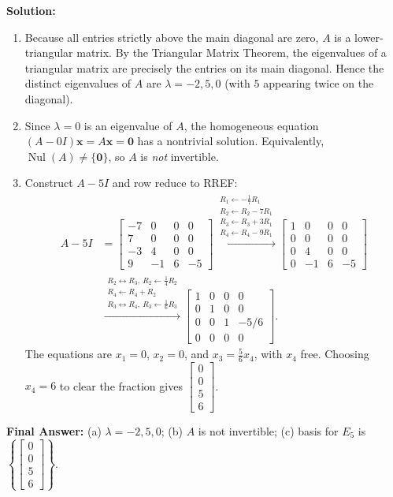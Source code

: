 \documentclass[11pt, letterpaper]{article}
\theoremstyle{definition}
\theoremstyle{remark}
\begin{document}
\textbf{Solution:}
\begin{enumerate}[label=(\alph*)]
    \item Because all entries strictly above the main diagonal are zero, $A$ is a lower-triangular matrix. By the Triangular Matrix Theorem, the eigenvalues of a triangular matrix are precisely the entries on its main diagonal. Hence the distinct eigenvalues of $A$ are $\lambda = -2, 5, 0$ (with $5$ appearing twice on the diagonal).

    \item Since $\lambda = 0$ is an eigenvalue of $A$, the homogeneous equation $(A - 0I)\mathbf{x} = A\mathbf{x} = \mathbf{0}$ has a nontrivial solution. Equivalently, $\operatorname{Nul}(A) \neq \{\mathbf{0}\}$, so $A$ is \emph{not} invertible.

    \item Construct $A - 5I$ and row reduce to RREF:
    \begin{align*}
    A - 5I &= \begin{bmatrix} -7 & 0 & 0 & 0 \\ 7 & 0 & 0 & 0 \\ -3 & 4 & 0 & 0 \\ 9 & -1 & 6 & -5 \end{bmatrix}
    \xrightarrow{\substack{R_1 \leftarrow -\frac{1}{7}R_1 \\ R_2 \leftarrow R_2 - 7R_1 \\ R_3 \leftarrow R_3 + 3R_1 \\ R_4 \leftarrow R_4 - 9R_1}}
    \begin{bmatrix} 1 & 0 & 0 & 0 \\ 0 & 0 & 0 & 0 \\ 0 & 4 & 0 & 0 \\ 0 & -1 & 6 & -5 \end{bmatrix} \\
    &\xrightarrow{\substack{R_2 \leftrightarrow R_3,\ R_2 \leftarrow \frac{1}{4}R_2 \\ R_4 \leftarrow R_4 + R_2 \\ R_3 \leftrightarrow R_4,\ R_3 \leftarrow \frac{1}{6}R_3}}
    \begin{bmatrix} 1 & 0 & 0 & 0 \\ 0 & 1 & 0 & 0 \\ 0 & 0 & 1 & -5/6 \\ 0 & 0 & 0 & 0 \end{bmatrix}.
    \end{align*}
    The equations are $x_1 = 0$, $x_2 = 0$, and $x_3 = \frac{5}{6}x_4$, with $x_4$ free. Choosing $x_4 = 6$ to clear the fraction gives $\begin{bmatrix} 0 \\ 0 \\ 5 \\ 6 \end{bmatrix}$.
\end{enumerate}
\textbf{Final Answer:} (a) $\lambda = -2, 5, 0$; (b) $A$ is not invertible; (c) basis for $E_5$ is $\left\{ \begin{bmatrix} 0 \\ 0 \\ 5 \\ 6 \end{bmatrix} \right\}$.
\end{document}
